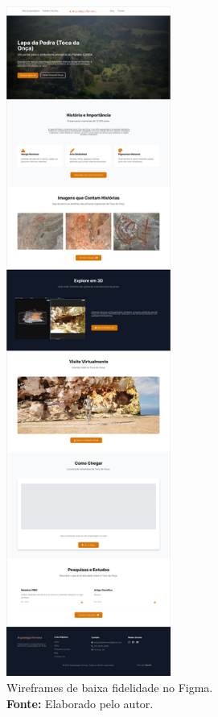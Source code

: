 \begin{figure}[H]
    \centering
    \begin{minipage}[b]{0.48\textwidth}
        \centering
        \includegraphics[height=22cm, keepaspectratio]{img/Protótipo/prototipo alta fidelidade toca da onça.png}
        \caption{Wireframes de baixa fidelidade no Figma. \\
            \textbf{Fonte:} Elaborado pelo autor.}
        \label{fig:wireframes}
    \end{minipage}
    \hfill
    \begin{minipage}[b]{0.48\textwidth}
        \centering

\end{minipage}
\end{figure}

